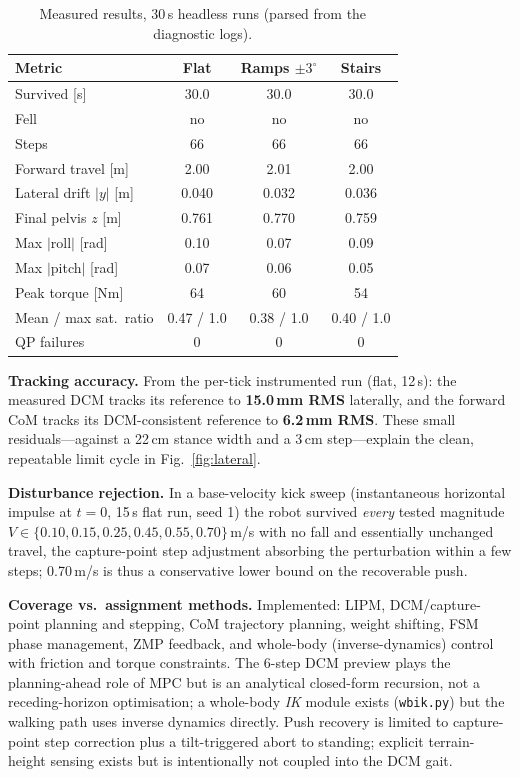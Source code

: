 \documentclass[10pt,a4paper]{article}
\providecommand{\toprule}{\hline\hline}
\providecommand{\midrule}{\hline}
\providecommand{\bottomrule}{\hline\hline}
\newcommand{\SI}[2]{#1\,#2}          %
\newcommand{\code}[1]{\texttt{\small #1}}
\begin{document}
\begin{table}[h]
\centering\small
\caption{Measured results, 30\,s headless runs (parsed from the diagnostic logs).}
\label{tab:results}
\begin{tabular}{lccc}
\toprule
Metric & Flat & Ramps $\pm3^\circ$ & Stairs\\
\midrule
Survived [s]            & 30.0 & 30.0 & 30.0\\
Fell                    & no & no & no\\
Steps                   & 66 & 66 & 66\\
Forward travel [m]      & 2.00 & 2.01 & 2.00\\
Lateral drift $|y|$ [m] & 0.040 & 0.032 & 0.036\\
Final pelvis $z$ [m]    & 0.761 & 0.770 & 0.759\\
Max $|$roll$|$ [rad]    & 0.10 & 0.07 & 0.09\\
Max $|$pitch$|$ [rad]   & 0.07 & 0.06 & 0.05\\
Peak torque [Nm]        & 64 & 60 & 54\\
Mean / max sat.\ ratio  & 0.47 / 1.0 & 0.38 / 1.0 & 0.40 / 1.0\\
QP failures             & 0 & 0 & 0\\
\bottomrule
\end{tabular}
\end{table}

\textbf{Tracking accuracy.} From the per-tick instrumented run (flat, 12\,s): the
measured DCM tracks its reference to \textbf{15.0\,mm RMS} laterally, and the
forward CoM tracks its DCM-consistent reference to \textbf{6.2\,mm RMS}. These
small residuals---against a 22\,cm stance width and a 3\,cm step---explain the
clean, repeatable limit cycle in Fig.~\ref{fig:lateral}.

\textbf{Disturbance rejection.} In a base-velocity kick sweep (instantaneous
horizontal impulse at $t{=}0$, 15\,s flat run, seed 1) the robot survived
\emph{every} tested magnitude $V\in\{0.10,0.15,0.25,0.45,0.55,0.70\}$\,m/s with no
fall and essentially unchanged travel, the capture-point step adjustment absorbing
the perturbation within a few steps; \SI{0.70}{m/s} is thus a conservative lower
bound on the recoverable push.

\textbf{Coverage vs.\ assignment methods.} Implemented: LIPM, DCM/capture-point
planning and stepping, CoM trajectory planning, weight shifting, FSM phase
management, ZMP feedback, and whole-body (inverse-dynamics) control with friction
and torque constraints. The 6-step DCM preview plays the planning-ahead role of
MPC but is an analytical closed-form recursion, not a receding-horizon
optimisation; a whole-body \emph{IK} module exists (\code{wbik.py}) but the
walking path uses inverse dynamics directly. Push recovery is limited to
capture-point step correction plus a tilt-triggered abort to standing; explicit
terrain-height sensing exists but is intentionally not coupled into the DCM gait.
\end{document}
